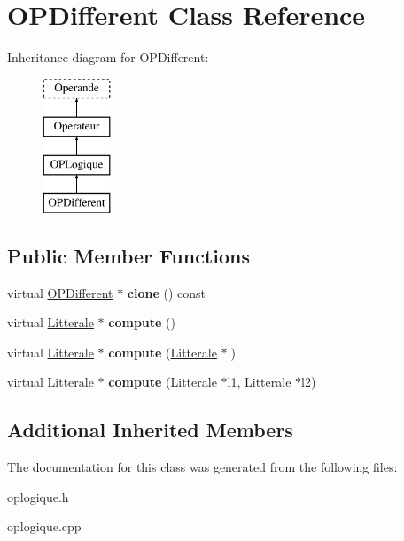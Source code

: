 \hypertarget{class_o_p_different}{}\section{O\+P\+Different Class Reference}
\label{class_o_p_different}
Inheritance diagram for O\+P\+Different\+:\begin{figure}[H]
\begin{center}
\leavevmode
\includegraphics[height=4.000000cm]{class_o_p_different}
\end{center}
\end{figure}
\subsection*{Public Member Functions}
\begin{DoxyCompactItemize}
\item 
virtual \hyperlink{class_o_p_different}{O\+P\+Different} $\ast$ {\bfseries clone} () const \hypertarget{class_o_p_different_a5ce33f9701f513327da5d2b4ae6a5567}{}\label{class_o_p_different_a5ce33f9701f513327da5d2b4ae6a5567}

\item 
virtual \hyperlink{class_litterale}{Litterale} $\ast$ {\bfseries compute} ()\hypertarget{class_o_p_different_a6ad8f42f202de22de29a39325b3ea884}{}\label{class_o_p_different_a6ad8f42f202de22de29a39325b3ea884}

\item 
virtual \hyperlink{class_litterale}{Litterale} $\ast$ {\bfseries compute} (\hyperlink{class_litterale}{Litterale} $\ast$l)\hypertarget{class_o_p_different_aeba793fc46067933df8f1d9374ba0b56}{}\label{class_o_p_different_aeba793fc46067933df8f1d9374ba0b56}

\item 
virtual \hyperlink{class_litterale}{Litterale} $\ast$ {\bfseries compute} (\hyperlink{class_litterale}{Litterale} $\ast$l1, \hyperlink{class_litterale}{Litterale} $\ast$l2)\hypertarget{class_o_p_different_a0558fae2b6cd09f4ada9b13be4f8c6e4}{}\label{class_o_p_different_a0558fae2b6cd09f4ada9b13be4f8c6e4}

\end{DoxyCompactItemize}
\subsection*{Additional Inherited Members}


The documentation for this class was generated from the following files\+:\begin{DoxyCompactItemize}
\item 
oplogique.\+h\item 
oplogique.\+cpp\end{DoxyCompactItemize}
